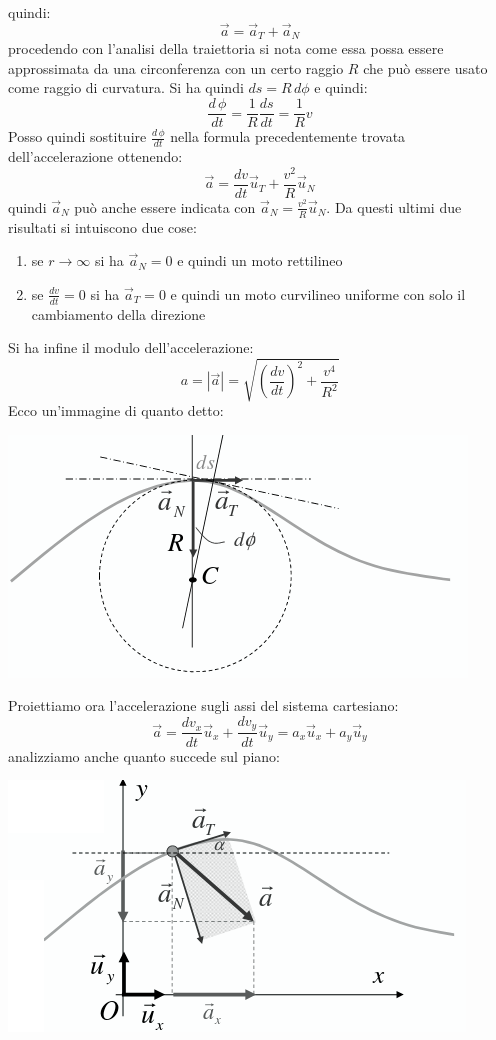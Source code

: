 \documentclass[a4paper,12pt, oneside]{book}
\begin{document}
quindi:
$$\vec{a}=\vec{a}_T+\vec{a}_N$$
procedendo con l'analisi della traiettoria si nota come essa possa essere approssimata da una circonferenza con un certo raggio $R$ che può essere usato come raggio di curvatura. Si ha quindi $ds=R\,d\phi$ e quindi:
$$\frac{d\,\phi}{dt}=\frac{1}{R}\frac{ds}{dt}=\frac{1}{R}v$$
Posso quindi sostituire $\frac{d\,\phi}{dt}$ nella formula precedentemente trovata dell'accelerazione ottenendo:
$$\vec{a}=\frac{dv}{dt}\vec{u}_T+\frac{v^2}{R}\vec{u}_N$$
quindi $\vec{a}_N$ può anche essere indicata con $\vec{a}_N=\frac{v^2}{R}\vec{u}_N$. Da questi ultimi due risultati si intuiscono due cose:
\begin{enumerate}
	\item se $r\to\infty$ si ha $\vec{a}_N=0$ e quindi un moto rettilineo
	\item se $\frac{dv}{dt}=0$ si ha $\vec{a}_T=0$ e quindi un moto curvilineo uniforme con solo il cambiamento della direzione
\end{enumerate}
Si ha infine il modulo dell'accelerazione:
$$a=|\vec{a}|=\sqrt{\left(\frac{dv}{dt}\right)^2+\frac{v^4}{R^2}}$$
Ecco un'immagine di quanto detto:
\begin{center}
	\includegraphics[scale=0.5]{img/pia8.png}
\end{center}
Proiettiamo ora l'accelerazione sugli assi del sistema cartesiano:
$$\vec{a}=\frac{dv_x}{dt}\vec{u}_x+\frac{dv_y}{dt}\vec{u}_y=a_x\vec{u}_x+a_y\vec{u}_y$$
analizziamo anche quanto succede sul piano:
\begin{center}
	\includegraphics[scale=0.6]{img/pia9.png}
\end{center}
\end{document}
